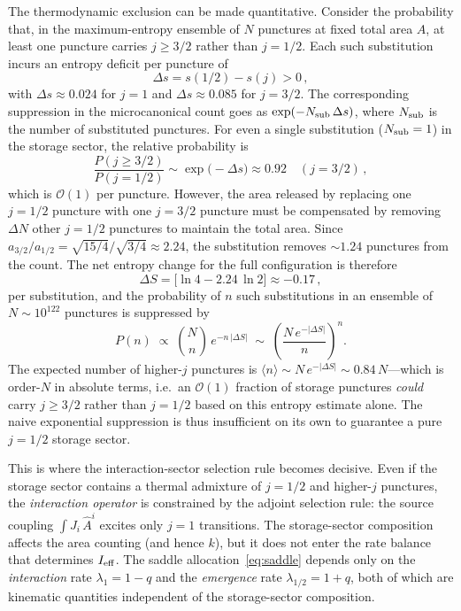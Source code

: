 \documentclass[aps,prd,twocolumn,10pt,superscriptaddress,nofootinbib]{revtex4-2}
\begin{document}
The thermodynamic exclusion can be made quantitative.  Consider
the probability that, in the maximum-entropy ensemble of $N$
punctures at fixed total area $A$, at least one puncture carries
$j \geq 3/2$ rather than $j = 1/2$.  Each such substitution
incurs an entropy deficit per puncture of
\begin{equation}
\Delta s
  = s(1/2) - s(j)
  > 0\,,
\label{eq:entropy_deficit}
\end{equation}
with $\Delta s \approx 0.024$ for $j = 1$ and
$\Delta s \approx 0.085$ for $j = 3/2$.  The corresponding
suppression in the microcanonical count goes as
$\exp(-N_{\rm sub}\,\Delta s)$, where $N_{\rm sub}$ is the number
of substituted punctures.  For even a single substitution
($N_{\rm sub} = 1$) in the storage sector, the relative
probability is
\begin{equation}
\frac{P(j \geq 3/2)}{P(j = 1/2)}
  \sim \exp\!\bigl(-\Delta s\bigr)
  \approx 0.92 \quad (j = 3/2)\,,
\label{eq:single_sub}
\end{equation}
which is $\mathcal{O}(1)$ per puncture.  However, the area
released by replacing one $j = 1/2$ puncture with one $j = 3/2$
puncture must be compensated by removing $\Delta N$ other
$j = 1/2$ punctures to maintain the total area.  Since
$a_{3/2}/a_{1/2} = \sqrt{15/4}/\sqrt{3/4} \approx 2.24$, the
substitution removes $\sim 1.24$ punctures from the count.  The
net entropy change for the full configuration is therefore
\begin{equation}
\Delta S
  = \bigl[\ln 4 - 2.24\,\ln 2\bigr]
  \approx -0.17\,,
\label{eq:net_entropy}
\end{equation}
per substitution, and the probability of $n$ such substitutions
in an ensemble of $N \sim 10^{122}$ punctures is suppressed by
\begin{equation}
P(n) \;\propto\;
  \binom{N}{n}\,e^{-n\,|\Delta S|}
  \;\sim\; \left(\frac{N\,e^{-|\Delta S|}}{n}\right)^n.
\label{eq:higher_j_prob}
\end{equation}
The expected number of higher-$j$ punctures is
$\langle n \rangle \sim N\,e^{-|\Delta S|} \sim 0.84\,N$---which
is order-$N$ in absolute terms, i.e.\ an $\mathcal{O}(1)$ fraction of
storage punctures \emph{could} carry $j \geq 3/2$ rather than
$j = 1/2$ based on this entropy estimate alone.  The naive
exponential suppression is thus insufficient on its own to
guarantee a pure $j = 1/2$ storage sector.

This is where the interaction-sector selection rule becomes
decisive.  Even if the storage sector contains a thermal
admixture of $j = 1/2$ and higher-$j$ punctures, the
\emph{interaction operator} is constrained by the adjoint
selection rule: the source coupling $\int J_i\,\hat{A}^i$ excites
only $j = 1$ transitions.  The storage-sector composition
affects the area counting (and hence $k$), but it does not enter
the rate balance that determines $I_{\rm eff}$.  The saddle
allocation~\eqref{eq:saddle} depends only on the
\emph{interaction} rate $\lambda_1 = 1-q$ and the
\emph{emergence} rate $\lambda_{1/2} = 1+q$, both of which are
kinematic quantities independent of the storage-sector
composition.
\end{document}
